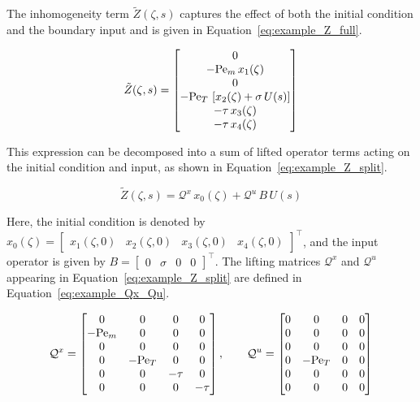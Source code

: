 The inhomogeneity term $\tilde{Z}(\zeta, s)$ captures the effect of both the initial condition and the boundary input and is given in Equation~\eqref{eq:example_Z_full}.

\begin{equation} \label{eq:example_Z_full}
\tilde{Z}(\zeta, s) =
\begin{bmatrix}
0 \\
-{\rm Pe}_m\, x_1(\zeta) \\
0 \\
-{\rm Pe}_T\, \left[ x_2(\zeta) + \sigma\, U(s) \right] \\
-\tau\, x_3(\zeta) \\
-\tau\, x_4(\zeta)
\end{bmatrix}
\end{equation}

This expression can be decomposed into a sum of lifted operator terms acting on the initial condition and input, as shown in Equation~\eqref{eq:example_Z_split}.

\begin{equation} \label{eq:example_Z_split}
\tilde{Z}(\zeta, s) = \mathcal{Q}^x\, x_0(\zeta) + \mathcal{Q}^u\, B\, U(s)
\end{equation}

Here, the initial condition is denoted by $x_0(\zeta) = \begin{bmatrix} x_1(\zeta, 0) & x_2(\zeta, 0) & x_3(\zeta, 0) & x_4(\zeta, 0) \end{bmatrix}^\top$, and the input operator is given by $B = \begin{bmatrix} 0 & \sigma & 0 & 0 \end{bmatrix}^\top$. The lifting matrices $\mathcal{Q}^x$ and $\mathcal{Q}^u$ appearing in Equation~\eqref{eq:example_Z_split} are defined in Equation~\eqref{eq:example_Qx_Qu}.

\begin{equation} \label{eq:example_Qx_Qu}
\mathcal{Q}^x =
\begin{bmatrix}
0 & 0 & 0 & 0 \\
-{\rm Pe}_m & 0 & 0 & 0 \\
0 & 0 & 0 & 0 \\
0 & -{\rm Pe}_T & 0 & 0 \\
0 & 0 & -\tau & 0 \\
0 & 0 & 0 & -\tau
\end{bmatrix}, \qquad
\mathcal{Q}^u =
\begin{bmatrix}
0 & 0 & 0 & 0 \\
0 & 0 & 0 & 0 \\
0 & 0 & 0 & 0 \\
0 & -{\rm Pe}_T & 0 & 0 \\
0 & 0 & 0 & 0 \\
0 & 0 & 0 & 0
\end{bmatrix}
\end{equation}

